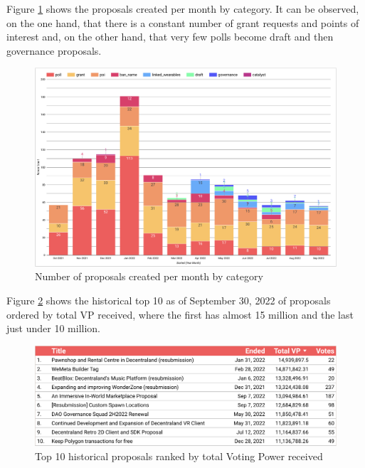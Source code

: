 \documentclass[MSE,Master,english]{twbook}%
\begin{document}
Figure \ref{fig:proposals_by_month} shows the proposals created per month by category. It can be observed, on the one hand, that there is a constant number of grant requests and points of interest and, on the other hand, that very few polls become draft and then governance proposals.
\begin{figure}[H]
  \centering
  \includegraphics[width=\textwidth]{metrics/proposals_by_month.png}
  \caption{Number of proposals created per month by category}
  \label{fig:proposals_by_month}
\end{figure}

Figure \ref{fig:top_proposals} shows the historical top 10 as of September 30, 2022 of proposals ordered by total VP received, where the first has almost 15 million and the last just under 10 million.
\begin{figure}[H]
  \centering
  \includegraphics[width=\textwidth]{metrics/top_proposals.png}
  \caption{Top 10 historical proposals ranked by total Voting Power received}
  \label{fig:top_proposals}
\end{figure}
\end{document}
